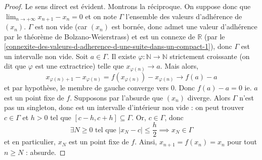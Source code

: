 	\begin{proof}
		Le sens direct est évident. Montrons la réciproque. On suppose donc que $\lim_{n \rightarrow +\infty } x_{n+1} - x_n = 0$ et on note $\Gamma$ l'ensemble des valeurs d'adhérence de $(x_n)$. $\Gamma$ est non vide (car $(x_n)$ est bornée, donc admet une valeur d'adhérence par le théorème de Bolzano-Weierstrass) et est un connexe de $\mathbb{R}$ (par le \cref{connexite-des-valeurs-d-adherence-d-une-suite-dans-un-compact-1}), donc $\Gamma$ est un intervalle non vide.
		\newpar
		Soit $a \in \Gamma$. Il existe $\varphi : \mathbb{N} \rightarrow \mathbb{N}$ strictement croissante (on dit que $\varphi$ est une extractrice) telle que $x_{\varphi(n)} \longrightarrow a$. Mais alors,
		\[ x_{\varphi(n) + 1} - x_{\varphi(n)} = f(x_{\varphi(n)}) - x_{\varphi(n)} \longrightarrow f(a) - a \]
		et par hypothèse, le membre de gauche converge vers $0$. Donc $f(a) - a = 0$ ie. $a$ est un point fixe de $f$.
		\newpar
		Supposons par l'absurde que $(x_n)$ diverge. Alors $\Gamma$ n'est pas un singleton, donc est un intervalle d'intérieur non vide : on peut trouver $c \in \Gamma$ et $h > 0$ tel que $[c - h, c + h] \subseteq \Gamma$.
		\newpar
		Or, $c \in \Gamma$, donc
		\[ \exists N \geq 0 \text{ tel que } |x_N - c| \leq \frac{h}{2} \implies x_N \in \Gamma \]
		et en particulier, $x_N$ est un point fixe de $f$. Ainsi, $x_{n+1} = f(x_n) = x_n$ pour tout $n \geq N$ : absurde.
	\end{proof}

